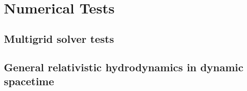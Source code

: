 
\chapter{Numerical Tests}  %

\ifpdf
    \graphicspath{{Chapter5/Figs/Raster/}{Chapter5/Figs/PDF/}{Chapter5/Figs/}}
\else
    \graphicspath{{Chapter5/Figs/Vector/}{Chapter5/Figs/}}
\fi


\section{Multigrid solver tests} %
\label{section5.1}

\section{General relativistic hydrodynamics in dynamic spacetime} %
\label{section5.2}

